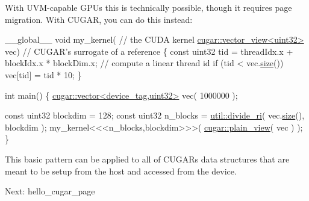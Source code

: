 \begin{DoxyParagraph}{}
With U\+V\+M-\/capable G\+P\+Us this is technically possible, though it requires page migration. With C\+U\+G\+AR, you can do this instead\+: 
\begin{DoxyCode}
\_\_global\_\_ \textcolor{keywordtype}{void} my\_kernel(                   \textcolor{comment}{// the CUDA kernel}
    \hyperlink{structcugar_1_1vector__view}{cugar::vector\_view<uint32>} vec)          \textcolor{comment}{// CUGAR's surrogate of a reference}
\{
    \textcolor{keyword}{const} uint32 tid = threadIdx.x + blockIdx.x * blockDim.x; \textcolor{comment}{// compute a linear thread id}
    \textcolor{keywordflow}{if} (tid < vec.\hyperlink{structcugar_1_1vector__view_a773841d0e535b07e40a99891e22d937e}{size}())
        vec[tid] = tid * 10;
\}

\textcolor{keywordtype}{int} main()
\{
    \hyperlink{structcugar_1_1vector}{cugar::vector<device\_tag,uint32>} vec( 1000000 );

    \textcolor{keyword}{const} uint32 blockdim = 128;
    \textcolor{keyword}{const} uint32 n\_blocks = \hyperlink{group___basic_utils_gabb6714186dbbd864f0a9298944ba509b}{util::divide\_ri}( vec.\hyperlink{structcugar_1_1vector__view_a773841d0e535b07e40a99891e22d937e}{size}(), blockdim );
    my\_kernel<<<n\_blocks,blockdim>>>( \hyperlink{namespacecugar_a347f91de482f0cb8dcba21c086b0aa46}{cugar::plain\_view}( vec ) );
\}
\end{DoxyCode}
 
\end{DoxyParagraph}
\begin{DoxyParagraph}{}
This basic pattern can be applied to all of C\+U\+G\+AR\textquotesingle{}s data structures that are meant to be setup from the host and accessed from the device.
\end{DoxyParagraph}
Next\+: hello\+\_\+cugar\+\_\+page 